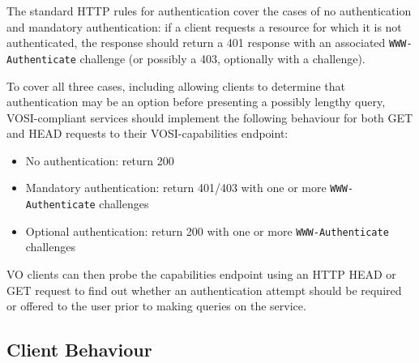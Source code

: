 \documentclass[11pt,a4paper]{ivoa}
\newcommand{\header}[1]{{\tt #1}}
\begin{document}
The standard HTTP rules for authentication cover the cases of
no authentication and mandatory authentication:
if a client requests a resource for which it is not authenticated,
the response should return a 401 response with an associated
\header{WWW-Authenticate} challenge
(or possibly a 403, optionally with a challenge).

To cover all three cases,
including allowing clients to determine that authentication may be an
option before presenting a possibly lengthy query,
VOSI-compliant services should implement the following behaviour
for both GET and HEAD requests to their VOSI-capabilities endpoint:
\begin{itemize}
  \item No authentication:
        return 200
  \item Mandatory authentication:
        return 401/403 with one or more \header{WWW-Authenticate} challenges
  \item Optional authentication:
        return 200 with one or more \header{WWW-Authenticate} challenges
\end{itemize}
VO clients can then probe the capabilities endpoint using an HTTP HEAD
or GET request to find out whether an authentication attempt should be
required or offered to the user prior to making queries on the service.

\subsection{Client Behaviour}
\end{document}
